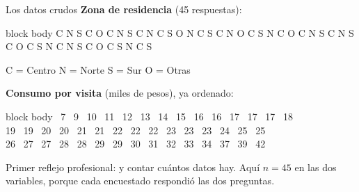 \documentclass[aspectratio=169,10pt]{beamer}
\begin{document}
\begin{frame}{Los datos crudos}
  \footnotesize
  \textbf{Zona de residencia} (45 respuestas):

  \vspace{0.1cm}
  \begin{beamercolorbox}[wd=\textwidth,sep=0.1cm]{block body}
    \centering\tiny\ttfamily
    C N S C O C N S C N C S O N C S C N O C S N C O C N S C N S C O C S N C N S C O C S N C S
  \end{beamercolorbox}
  {\tiny C = Centro \quad N = Norte \quad S = Sur \quad O = Otras}

  \vspace{0.15cm}
  \textbf{Consumo por visita} (miles de pesos), ya ordenado:

  \vspace{0.1cm}
  \begin{beamercolorbox}[wd=\textwidth,sep=0.1cm]{block body}
    \centering\tiny{} \ 7 \ 9 \ 10 \ 11 \ 12 \ 13 \ 14 \ 15 \ 16 \ 16 \ 17 \ 17 \ 17 \ 18 \\
    19 \ 19 \ 20 \ 20 \ 21 \ 21 \ 22 \ 22 \ 22 \ 23 \ 23 \ 23 \ 24 \ 25 \ 25 \\
    26 \ 27 \ 27 \ 28 \ 28 \ 29 \ 29 \ 30 \ 31 \ 32 \ 33 \ 34 \ 37 \ 39 \ 42
  \end{beamercolorbox}

  \vspace{0.1cm}
  {\scriptsize\color{uniGris} Primer reflejo profesional:  y
  contar cuántos datos hay. Aquí $n = 45$ en las dos variables, porque cada
  encuestado respondió las dos preguntas.}
\end{frame}
\end{document}
